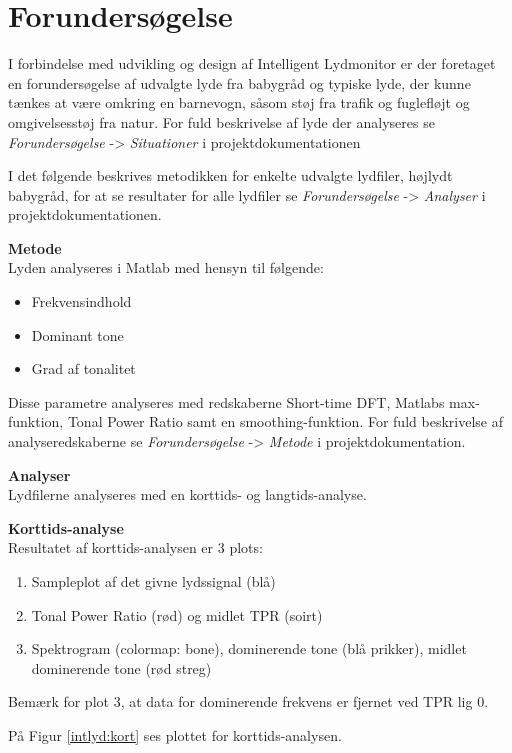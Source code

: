 \section{Forundersøgelse}
I forbindelse med udvikling og design af Intelligent Lydmonitor er der foretaget en forundersøgelse af udvalgte lyde fra babygråd og typiske lyde, der kunne tænkes at være omkring en barnevogn, såsom støj fra trafik og fuglefløjt og omgivelsesstøj fra natur. For fuld beskrivelse af lyde der analyseres se \textit{Forundersøgelse} -> \textit{Situationer} i projektdokumentationen 

I det følgende beskrives metodikken for enkelte udvalgte lydfiler, højlydt babygråd, for at se resultater for alle lydfiler se \textit{Forundersøgelse} -> \textit{Analyser} i projektdokumentationen. 

\textbf{Metode} \\
Lyden analyseres i Matlab med hensyn til følgende: 
\begin{itemize}
\item Frekvensindhold
\item Dominant tone
\item Grad af tonalitet
\end{itemize}

Disse parametre analyseres med redskaberne Short-time DFT, Matlabs max-funktion, Tonal Power Ratio samt en smoothing-funktion. For fuld beskrivelse af analyseredskaberne se \textit{Forundersøgelse} -> \textit{Metode} i projektdokumentation. 

\textbf{Analyser}\\
Lydfilerne analyseres med en korttids- og langtids-analyse. 

\textbf{Korttids-analyse}\\
Resultatet af korttids-analysen er 3 plots:
\begin{enumerate}
\item Sampleplot af det givne lydssignal (blå)
\item Tonal Power Ratio (rød) og midlet TPR (soirt)
\item Spektrogram (colormap: bone), dominerende tone (blå prikker), midlet dominerende tone (rød streg)
\end{enumerate}
Bemærk for plot 3, at data for dominerende frekvens er fjernet ved TPR lig 0.

På Figur \ref{intlyd:kort} ses plottet for korttids-analysen.



